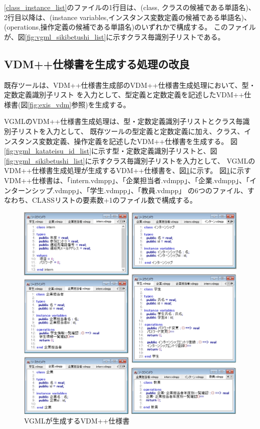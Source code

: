 \ref{class_instance_list}のファイルの1行目は、(class, クラスの候補である単語名)、
2行目以降は、(instance variables,インスタンス変数定義の候補である単語名)、 (operations,操作定義の候補である単語名)のいずれかで構成する。
このファイルが、図\ref{fig:vgml_sikibetushi_list}に示すクラス毎識別子リストである。

\subsection{VDM++仕様書を生成する処理の改良}
既存ツールは、VDM++仕様書生成部のVDM++仕様書生成処理において、型・定数定義識別子リスト
を入力として、型定義と定数定義を記述したVDM++仕様書(図\ref{fig:exis_vdm}参照)を生成する。

VGMLのVDM++仕様書生成処理は、型・定数定義識別子リストとクラス毎識別子リストを入力として、
既存ツールの型定義と定数定義に加え、クラス、インスタンス変数定義、操作定義を記述したVDM++仕様書を生成する。
図\ref{fig:vgml_katateisu_id_list}に示す型・定数定義識別子リストと、図\ref{fig:vgml_sikibetushi_list}に示すクラス毎識別子リストを入力として、
VGMLのVDM++仕様書生成処理が生成するVDM++仕様書を、図\ref{fig:4_vdm}に示す。
図\ref{fig:4_vdm}に示すVDM++仕様書は、「intern.vdmpp」、「企業担当者.vdmpp」、「企業.vdmpp」、「インターンシップ.vdmpp」、「学生.vdmpp」、「教員.vdmpp」
の6つのファイル、すなわち、CLASSリストの要素数+1のファイル数で構成する。

\begin{figure}[p]
    \begin{center}
        \includegraphics[width=1.0\columnwidth]{image/4_vdm.png}
        \caption{VGMLが生成するVDM++仕様書}
        \label{fig:4_vdm}
    \end{center}
\end{figure}

